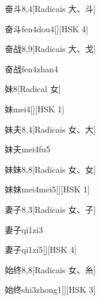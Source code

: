 \begin{entry}{奋斗}{8,4}[Radicais ⼤、⽃]
  \begin{phonetics}{奋斗}{fen4dou4}[][HSK 4]
  \end{phonetics}
\end{entry}

\begin{entry}{奋战}{8,9}[Radicais ⼤、⼽]
  \begin{phonetics}{奋战}{fen4zhan4}
  \end{phonetics}
\end{entry}

\begin{entry}{妹}{8}[Radical ⼥]
  \begin{phonetics}{妹}{mei4}[][HSK 1]
  \end{phonetics}
\end{entry}

\begin{entry}{妹夫}{8,4}[Radicais ⼥、⼤]
  \begin{phonetics}{妹夫}{mei4fu5}
  \end{phonetics}
\end{entry}

\begin{entry}{妹妹}{8,8}[Radicais ⼥、⼥]
  \begin{phonetics}{妹妹}{mei4mei5}[][HSK 1]
  \end{phonetics}
\end{entry}

\begin{entry}{妻子}{8,3}[Radicais ⼥、⼦]
  \begin{phonetics}{妻子}{qi1zi3}
  \end{phonetics}
  \begin{phonetics}{妻子}{qi1zi5}[][HSK 4]
  \end{phonetics}
\end{entry}

\begin{entry}{始终}{8,8}[Radicais ⼥、⽷]
  \begin{phonetics}{始终}{shi3zhong1}[][HSK 3]
  \end{phonetics}
\end{entry}

